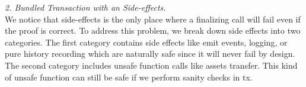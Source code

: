 






\smallskip\noindent\emph{2. Bundled Transaction with an Side-effects.}\\
We notice that side-effects is the only place where a finalizing call will fail even if the proof is correct. To address this problem, we break down side effects into two categories. The first category contains side effects like emit events, logging, or pure history recording which are naturally safe since it will never fail by design. The second category includes unsafe function calls like assets transfer. This kind of unsafe function can still be safe if we perform sanity checks in tx.

